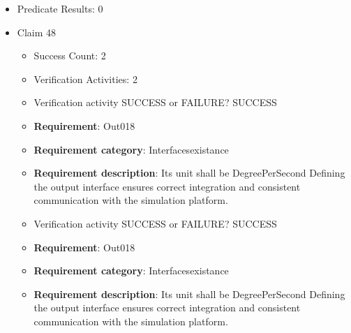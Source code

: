 \documentclass{article}
\begin{document}
\begin{itemize}
\begin{itemize}
						\item \textbf{Requirement}: Out017 
						\item \textbf{Requirement category}: Interfacesexistance 
						\item \textbf{Requirement description}: Its unit shall be Degree Defining the output interface ensures correct integration and consistent communication with the simulation platform.
					
					\item Verification activity SUCCESS or FAILURE? SUCCESS
		
						\item \textbf{Requirement}: Out017 
						\item \textbf{Requirement category}: Interfacesexistance 
						\item \textbf{Requirement description}: Its unit shall be Degree Defining the output interface ensures correct integration and consistent communication with the simulation platform.
					
				\end{itemize}
				
									    
				\item Predicate Results: 0

  				  \item Claim 48
				\begin{itemize}
			    	\item Success Count: 2 
			    	\item Verification Activities: 2
					\item Verification activity SUCCESS or FAILURE? SUCCESS
		
						\item \textbf{Requirement}: Out018 
						\item \textbf{Requirement category}: Interfacesexistance 
						\item \textbf{Requirement description}: Its unit shall be DegreePerSecond Defining the output interface ensures correct integration and consistent communication with the simulation platform.
					
					\item Verification activity SUCCESS or FAILURE? SUCCESS
		
						\item \textbf{Requirement}: Out018 
						\item \textbf{Requirement category}: Interfacesexistance 
						\item \textbf{Requirement description}: Its unit shall be DegreePerSecond Defining the output interface ensures correct integration and consistent communication with the simulation platform.
					

\end{itemize}
\end{itemize}
\end{document}
